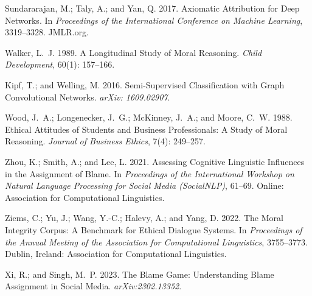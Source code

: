 \documentclass[letterpaper]{article} %
\begin{document}
\begin{thebibliography}{46}
Sundararajan, M.; Taly, A.; and Yan, Q. 2017.
\newblock Axiomatic Attribution for Deep Networks.
\newblock In \emph{Proceedings of the International Conference on Machine
  Learning}, 3319–3328. JMLR.org.


Walker, L.~J. 1989.
\newblock A Longitudinal Study of Moral Reasoning.
\newblock \emph{Child Development}, 60(1): 157--166.


Kipf, T.; and Welling, M. 2016.
\newblock Semi-Supervised Classification with Graph Convolutional Networks.
\newblock \emph{arXiv: 1609.02907}.

Wood, J.~A.; Longenecker, J.~G.; McKinney, J.~A.; and Moore, C.~W. 1988.
\newblock Ethical Attitudes of Students and Business Professionals: {A} Study
  of Moral Reasoning.
\newblock \emph{Journal of Business Ethics}, 7(4): 249--257.

Zhou, K.; Smith, A.; and Lee, L. 2021.
\newblock Assessing Cognitive Linguistic Influences in the Assignment of Blame.
\newblock In \emph{Proceedings of the International Workshop on Natural
  Language Processing for Social Media (SocialNLP)}, 61--69. Online:
  Association for Computational Linguistics.

Ziems, C.; Yu, J.; Wang, Y.-C.; Halevy, A.; and Yang, D. 2022.
\newblock The Moral Integrity Corpus: {A} Benchmark for Ethical Dialogue
  Systems.
\newblock In \emph{Proceedings of the Annual Meeting of the Association for
  Computational Linguistics}, 3755--3773. Dublin, Ireland: Association for
  Computational Linguistics.

Xi, R.; and Singh, M.~P. 2023.
\newblock The Blame Game: {U}nderstanding Blame Assignment in Social Media.
\newblock \emph{arXiv:2302.13352}.

\end{thebibliography}
\end{document}
